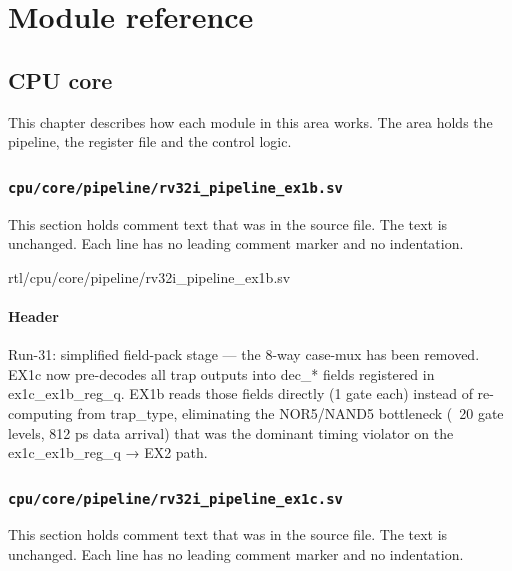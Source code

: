 \part{Module reference}\label{tm:part:module-reference}

\chapter{CPU core}\label{tm:ch:mod-cpu-core}

This chapter describes how each module in this area works. The area holds the pipeline, the register file and the control logic.

\section{\texttt{cpu/core/pipeline/rv32i\_pipeline\_ex1b.sv}}\label{tm:mod:rv32i-pipeline-ex1b}

This section holds comment text that was in the source file. The text is unchanged. Each line has no leading comment marker and no indentation.

\begin{relocated}{rtl/cpu/core/pipeline/rv32i_pipeline_ex1b.sv}

\subsection*{Header}

\begin{textblock}
Run-31: simplified field-pack stage — the 8-way case-mux has been removed.
EX1c now pre-decodes all trap outputs into dec_* fields registered in
ex1c_ex1b_reg_q.  EX1b reads those fields directly (1 gate each) instead
of re-computing from trap_type, eliminating the NOR5/NAND5 bottleneck
(~20 gate levels, 812 ps data arrival) that was the dominant timing violator
on the ex1c_ex1b_reg_q → EX2 path.
\end{textblock}

\end{relocated}

\section{\texttt{cpu/core/pipeline/rv32i\_pipeline\_ex1c.sv}}\label{tm:mod:rv32i-pipeline-ex1c}

This section holds comment text that was in the source file. The text is unchanged. Each line has no leading comment marker and no indentation.

